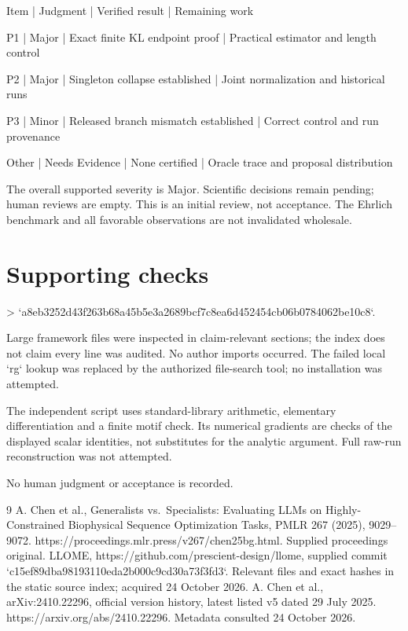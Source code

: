 \documentclass[10pt]{article}
\begin{document}
Item | Judgment | Verified result | Remaining work\par
P1 | Major | Exact finite KL endpoint proof | Practical estimator and length control\par
P2 | Major | Singleton collapse established | Joint normalization and historical runs\par
P3 | Minor | Released branch mismatch established | Correct control and run provenance\par
Other | Needs Evidence | None certified | Oracle trace and proposal distribution\par
The overall supported severity is Major. Scientific decisions remain pending; human reviews are empty. This is an initial review, not acceptance. The Ehrlich benchmark and all favorable observations are not invalidated wholesale.\par
\section*{Supporting checks}
> `a8eb3252d43f263b68a45b5e3a2689bcf7c8ea6d452454cb06b0784062be10c8`.\par
Large framework files were inspected in claim-relevant sections; the index does not claim every line was audited. No author imports occurred. The failed local `rg` lookup was replaced by the authorized file-search tool; no installation was attempted.\par
The independent script uses standard-library arithmetic, elementary differentiation and a finite motif check. Its numerical gradients are checks of the displayed scalar identities, not substitutes for the analytic argument. Full raw-run reconstruction was not attempted.\par
No human judgment or acceptance is recorded.\par
9 A. Chen et al., Generalists vs. Specialists: Evaluating LLMs on Highly-Constrained Biophysical Sequence Optimization Tasks, PMLR 267 (2025), 9029–9072. https://proceedings.mlr.press/v267/chen25bg.html. Supplied proceedings original. LLOME, https://github.com/prescient-design/llome, supplied commit `c15ef89dba98193110eda2b000c9cd30a73f3fd3`. Relevant files and exact hashes in the static source index; acquired 24 October 2026. A. Chen et al., arXiv:2410.22296, official version history, latest listed v5 dated 29 July 2025. https://arxiv.org/abs/2410.22296. Metadata consulted 24 October 2026.\par
\end{document}
